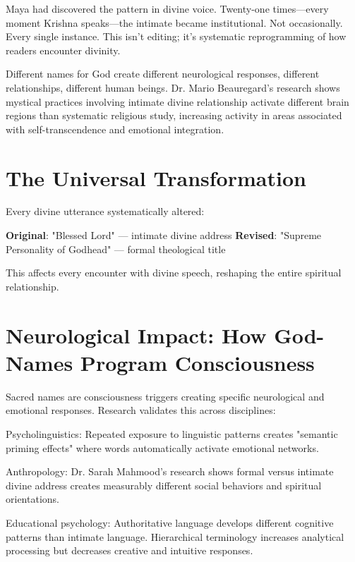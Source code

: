 \documentclass[11pt,twoside]{book}
\begin{document}
\normalfont\justifying
Maya had discovered the pattern in divine voice. Twenty-one times—every moment Krishna speaks—the intimate became institutional. Not occasionally. Every single instance. This isn't editing; it's systematic reprogramming of how readers encounter divinity.

Different names for God create different neurological responses, different relationships, different human beings. Dr. Mario Beauregard's research shows mystical practices involving intimate divine relationship activate different brain regions than systematic religious study, increasing activity in areas associated with self-transcendence and emotional integration.

\vspace{-0.5cm}
\section*{The Universal Transformation}
\label{sec:org35e4c76}

Every divine utterance systematically altered:

\textbf{\textbf{Original}}: "Blessed Lord" — intimate divine address
\textbf{\textbf{Revised}}: "Supreme Personality of Godhead" — formal theological title

This affects every encounter with divine speech, reshaping the entire spiritual relationship.
\section*{Neurological Impact: How God-Names Program Consciousness}
\label{sec:org35f90ce}

Sacred names are consciousness triggers creating specific neurological and emotional responses. Research validates this across disciplines:

Psycholinguistics: Repeated exposure to linguistic patterns creates "semantic priming effects" where words automatically activate emotional networks.

Anthropology: Dr. Sarah Mahmood's research shows formal versus intimate divine address creates measurably different social behaviors and spiritual orientations.

Educational psychology: Authoritative language develops different cognitive patterns than intimate language. Hierarchical terminology increases analytical processing but decreases creative and intuitive responses.
\end{document}
